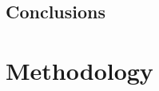 \documentclass[12pt]{article}
\begin{document}
\subsection{Conclusions}

\section{Methodology} 







\end{document}
